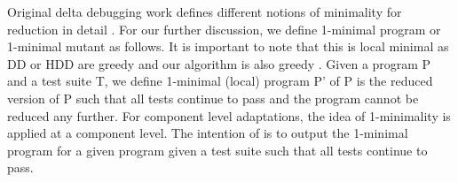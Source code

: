 
Original delta debugging work defines different notions of minimality for reduction in detail \cite{ddOriginal}. For our further discussion, we define 1-minimal program or 1-minimal mutant as follows. It is important to note that this is local minimal as DD or HDD are greedy and our algorithm is also greedy \cite{ddOriginal, hddOriginal}. Given a program P and a  test suite T, we define 1-minimal (local) program P' of P is the reduced version of P such that all tests continue to pass and the program cannot be reduced any further. For component level adaptations, the idea of 1-minimality is applied at a component level. The intention of \mytool is to output the 1-minimal program for a given program given a test suite such that all tests continue to pass. 
